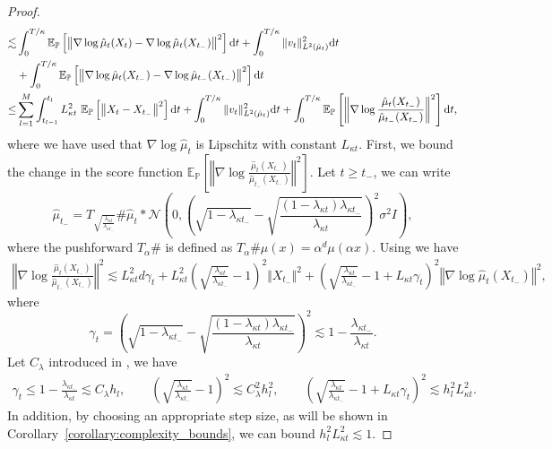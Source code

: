 \begin{proof}
\begin{align}
    \lesssim& \int_0^{T/\kappa}\mathbb{E}_{\mathbb{P}} \left[\left\Vert \nabla\log \hat{\mu}_t(X_t)-\nabla \log \hat{\mu}_t(X_{t_-})\right\Vert^2\right]\md t + \int_0^{T/\kappa} \Vert v_t\Vert^2_{L^2({\hat{\mu}}_t)} \md t \nonumber\\
    &+ \int_0^{T/\kappa}\mathbb{E}_{\mathbb{P}} \left[\left\Vert \nabla\log \hat{\mu}_t(X_{t_-})-\nabla \log \hat{\mu}_{t_-}(X_{t_-})\right\Vert^2\right]\md t \nonumber\\
    \leq&  \sum_{l=1}^M\int_{t_{l-1}}^{t_l} L_{\kappa t}^2 \ \mathbb{E}_{\mathbb{P}} \left[\left\Vert X_t-X_{t_-}\right\Vert^2\right]\md t+ \int_0^{T/\kappa} \Vert v_t\Vert^2_{L^2({\hat{\mu}}_t)} \md t+ \int_0^{T/\kappa}\mathbb{E}_{\mathbb{P}} \left[\left\Vert \nabla\log \frac{\hat{\mu}_t(X_{t_-})}{\hat{\mu}_{t_-}(X_{t_-})}\right\Vert^2\right]\md t, \label{eq:kl_path_bound_intermediate}
\end{align}
where we have used that $\nabla\log\hat{\mu}_t$ is Lipschitz with constant $L_{\kappa t}$.
First, we bound the change in the score function $\mathbb{E}_{\mathbb{P}} \left[\left\Vert \nabla\log \frac{\hat{\mu}_t(X_{t_-})}{\hat{\mu}_{t_-}(X_{t_-})}\right\Vert^2\right]$. Let $t\geq t_{-}$, we can write
\begin{equation*}
    \hat{\mu}_{t_-} = T_{\sqrt{\frac{\lambda_{\kappa t}}{\lambda_{\kappa t_-}}}} \#\hat{\mu}_t * \mathcal{N}\left(0, \left(\sqrt{1-\lambda_{\kappa t_-}}-\sqrt{\frac{(1-\lambda_{\kappa t})\lambda_{\kappa t_-}}{\lambda_{\kappa t}}}\right)^2\sigma^2 I\right),
\end{equation*}
where the pushforward $T_{\alpha}\#$ is defined as $T_{\alpha}\#\mu(x) = \alpha^d \mu(\alpha x)$. Using \citet[Lemma C.12]{lee2022convergence} we have
\begin{align*}
    \left\Vert \nabla\log \frac{\hat{\mu}_t(X_{t_-})}{\hat{\mu}_{t_-}(X_{t_-})}\right\Vert^2 \lesssim L_{\kappa t}^2d \gamma_t + L_{\kappa t}^2\left(\sqrt{\frac{\lambda_{\kappa t}}{\lambda_{\kappa t_-}}}-1\right)^2 \Vert X_{t_-}\Vert^2 + \left(\sqrt{\frac{\lambda_{\kappa t}}{\lambda_{\kappa t_-}}} -1 + L_{\kappa t} \gamma_t\right)^2 \left\Vert \nabla \log\hat{\mu}_t(X_{t_-})\right\Vert^2,
\end{align*}
where
\begin{equation*}
    \gamma_t  = \left(\sqrt{1-\lambda_{\kappa t_-}}-\sqrt{\frac{(1-\lambda_{\kappa t})\lambda_{\kappa t_-}}{\lambda_{\kappa t}}}\right)^2\lesssim 1-\frac{\lambda_{\kappa t_-}}{\lambda_{\kappa t}}.
\end{equation*}
Let $C_\lambda$ introduced in , we have
\begin{align*}
\gamma_t \leq 1-\frac{\lambda_{\kappa t_-}}{\lambda_{\kappa t}}\lesssim C_\lambda h_l, \quad \quad \left(\sqrt{\frac{\lambda_{\kappa t}}{\lambda_{\kappa t_-}}}-1\right)^2 \lesssim C_\lambda^2 h_l^2,\quad\quad
    \left(\sqrt{\frac{\lambda_{\kappa t}}{\lambda_{\kappa t_-}}} -1+ L_{\kappa t} \gamma_t\right)^2\lesssim h_l^2 L_{\kappa t}^2.
\end{align*}
In addition, by choosing an appropriate step size, as will be shown in Corollary~\ref{corollary:complexity_bounds}, we can bound $h_l^2 L_{\kappa t}^2\lesssim 1$.


\end{proof}
